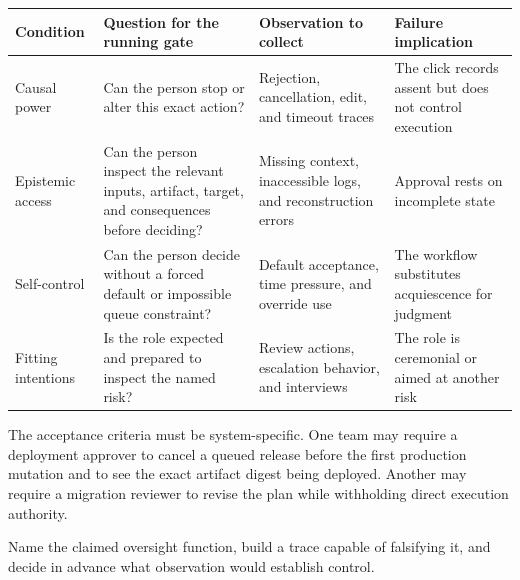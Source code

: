 \begin{longtable}[]{@{}
  >{\raggedright\arraybackslash}p{}
  >{\raggedright\arraybackslash}p{}
  >{\raggedright\arraybackslash}p{}
  >{\raggedright\arraybackslash}p{}@{}}
\toprule\noalign{}
\begin{minipage}[b]{\linewidth}\raggedright
Condition
\end{minipage} & \begin{minipage}[b]{\linewidth}\raggedright
Question for the running gate
\end{minipage} & \begin{minipage}[b]{\linewidth}\raggedright
Observation to collect
\end{minipage} & \begin{minipage}[b]{\linewidth}\raggedright
Failure implication
\end{minipage} \\
\midrule\noalign{}
\endhead
\bottomrule\noalign{}
\endlastfoot
Causal power & Can the person stop or alter this exact action? & Rejection, cancellation, edit, and timeout traces & The click records assent but does not control execution \\
Epistemic access & Can the person inspect the relevant inputs, artifact, target, and consequences before deciding? & Missing context, inaccessible logs, and reconstruction errors & Approval rests on incomplete state \\
Self-control & Can the person decide without a forced default or impossible queue constraint? & Default acceptance, time pressure, and override use & The workflow substitutes acquiescence for judgment \\
Fitting intentions & Is the role expected and prepared to inspect the named risk? & Review actions, escalation behavior, and interviews & The role is ceremonial or aimed at another risk \\
\end{longtable}

The acceptance criteria must be system-specific. One team may require a deployment approver to cancel a queued release before the first production mutation and to see the exact artifact digest being deployed. Another may require a migration reviewer to revise the plan while withholding direct execution authority.

Name the claimed oversight function, build a trace capable of falsifying it, and decide in advance what observation would establish control.


